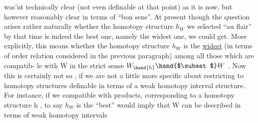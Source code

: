 was'nt technically clear (not even definable at that point) as it is now,
but however reasonably clear in terms of  ``bon sens''. At present though
the question arises rather naturally whether the homotopy structure $h_W$
we selected ``au flair'' by that time is indeed the best one, namely the
widest one, we could get. More explicitly, this means whether the
homotopy structure $h_W$ is the \uline{widest} (in terms of   order relation
considered in the previous paragraph) among all those which are compatib-%
le with W in the strict sense $W_{\hand{h}} \hand{$\subset$} W$ . Now this is certainly not so , if
we are not a little more specific about  restricting to homotopy
structures definable in terms of a weak homotopy interval structure.
For instance, if we  
 compatible with products,
corresponding to a homotopy structure h , to say $h_W$ is the ``best'' would
 imply that W  can be described in terms of weak homotopy intervals

